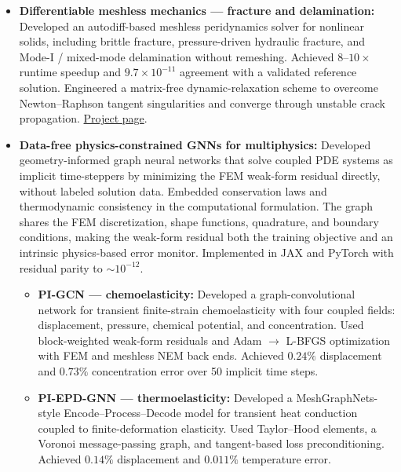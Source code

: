 \documentclass[10pt, letterpaper]{article}
\begin{document}
\begin{itemize}
\item \textbf{Differentiable meshless mechanics --- fracture and delamination:}
Developed an autodiff-based meshless peridynamics solver for nonlinear solids,
including brittle fracture, pressure-driven hydraulic fracture, and Mode-I /
mixed-mode delamination without remeshing. Achieved $8$--$10\times$ runtime
speedup and $9.7\times10^{-11}$ agreement with a validated reference solution.
Engineered a matrix-free dynamic-relaxation scheme to overcome Newton--Raphson
tangent singularities and converge through unstable crack propagation.
\href{https://miladshirani.github.io/research-peridynamic-fracture.html}
{Project page}.


\item \textbf{Data-free physics-constrained GNNs for multiphysics:}
Developed geometry-informed graph neural networks that solve coupled PDE
systems as implicit time-steppers by minimizing the FEM weak-form residual
directly, without labeled solution data. Embedded conservation laws and
thermodynamic consistency in the computational formulation. The graph shares
the FEM discretization, shape functions, quadrature, and boundary conditions,
making the weak-form residual both the training objective and an intrinsic
physics-based error monitor. Implemented in JAX and PyTorch with residual
parity to $\sim10^{-12}$.

\begin{itemize}[
  leftmargin=1.2em,
  itemsep=1pt,
  topsep=2pt,
  parsep=0pt,
  label=\textcolor{midgray}{\textendash}
]

\item \textbf{PI-GCN --- chemoelasticity:}
Developed a graph-convolutional network for transient finite-strain
chemoelasticity with four coupled fields: displacement, pressure, chemical
potential, and concentration. Used block-weighted weak-form residuals and
Adam $\rightarrow$ L-BFGS optimization with FEM and meshless NEM back ends.
Achieved $0.24\%$ displacement and $0.73\%$ concentration error over 50
implicit time steps.

\item \textbf{PI-EPD-GNN --- thermoelasticity:}
Developed a MeshGraphNets-style Encode--Process--Decode model for transient
heat conduction coupled to finite-deformation elasticity. Used Taylor--Hood
elements, a Voronoi message-passing graph, and tangent-based loss
preconditioning. Achieved $0.14\%$ displacement and $0.011\%$ temperature
error.


\end{itemize}
\end{itemize}
\end{document}
